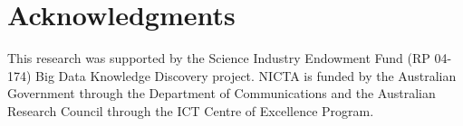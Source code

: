 \documentclass{article}
\begin{document}
 

 










\section*{Acknowledgments}
{
\small
This research was supported by the Science Industry Endowment Fund (RP 04-174)
Big Data Knowledge Discovery project. 
%
NICTA is funded by the Australian Government through the Department of
Communications and the Australian Research Council through the ICT Centre of
Excellence Program.
}



\end{document}
